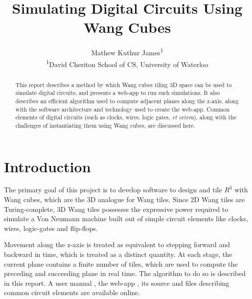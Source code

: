 \documentclass[letterpaper,11pt]{article}
\title{Simulating Digital Circuits Using Wang Cubes}
\author{Mathew Kuthur James\textsuperscript{1}
\vspace{10pt}\\
\textsuperscript{1}David Cheriton School of CS, University of Waterloo} %
\date{}					%
\begin{document}
\maketitle

\thispagestyle{empty}

\begin{abstract}

This report describes a method by which Wang cubes tiling 3D space can be used to simulate digital circuits, and presents a web-app to run such simulations. It also describes an efficient algorithm used to compute adjacent planes along the z-axis, along with the software architecture and technology used to create the web-app. Common elements of digital circuits (such as clocks, wires, logic gates, \emph{et cetera}), along with the challenges of instantiating them using Wang cubes, are discussed here.

\end{abstract}


\section*{Introduction}

The primary goal of this project is to develop software to design and tile $R^3$ with Wang cubes, which are the 3D analogue for Wang tiles. Since 2D Wang tiles are Turing-complete, 3D Wang tiles possesses the expressive power required to simulate a Von Neumann machine built out of simple circuit elements like clocks, wires, logic-gates and flip-flops. 

Movement along the z-axis is treated as equivalent to stepping forward and backward in time, which is treated as a distinct quantity. At each stage, the current plane contains a finite number of tiles, which are used to compute the preceding and succeeding plane in real time. The algorithm to do so is described in this report. A user manual \cite{manual}, the web-app \cite{web-app}, its source \cite{web-app-source} and files describing common circuit elements \cite{wang-file} are available online.
\end{document}
